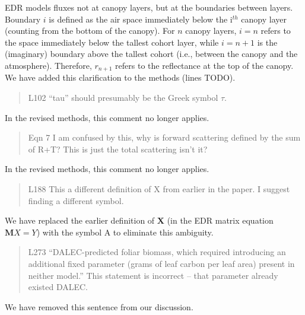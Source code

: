 EDR models fluxes not at canopy layers, but at the boundaries between layers.
Boundary $i$ is defined as the air space immediately below the i$^{th}$ canopy layer (counting from the bottom of the canopy).
For $n$ canopy layers, $i = n$ refers to the space immediately below the tallest cohort layer, while $i = n+1$ is the (imaginary) boundary above the tallest cohort (i.e., between the canopy and the atmosphere).
Therefore, $r_{n+1}$ refers to the reflectance at the top of the canopy.
We have added this clarification to the methods (lines TODO).

\begin{quote}
L102 “tau” should presumably be the Greek symbol $\tau$.
\end{quote}

In the revised methods, this comment no longer applies.

\begin{quote}
Eqn 7 I am confused by this, why is forward scattering defined by the sum of R+T? This is just the total scattering isn’t it?
\end{quote}

In the revised methods, this comment no longer applies.

\begin{quote}
L188 This a different definition of X from earlier in the paper. I suggest finding a different symbol.
\end{quote}

We have replaced the earlier definition of $\mathbf{X}$ (in the EDR matrix equation $\mathbf{M}{X} = {Y}$) with the symbol A to eliminate this ambiguity.

\begin{quote}
L273 “DALEC-predicted foliar biomass, which required introducing an additional fixed parameter (grams of leaf carbon per leaf area) present in neither model.” This statement is incorrect – that parameter already existed DALEC.
\end{quote}

We have removed this sentence from our discussion.
